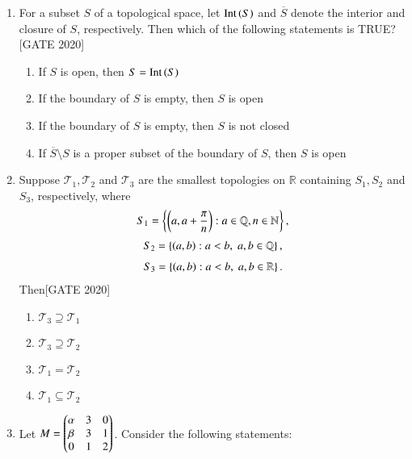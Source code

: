 \documentclass[journal,12pt,onecolumn]{IEEEtran}
\theoremstyle{remark}
\begin{document}
\begin{enumerate}
    \item  For a subset $S$ of a topological space, let $\text{Int}\left(S\right)$ and $\overline{S}$ denote the interior and closure of $S$, respectively. Then which of the following statements is TRUE?
    \hfill{[GATE 2020]}
      \begin{enumerate}
            \item If $S$ is open, then $S = \text{Int}\left(S\right)$
            \item If the boundary of $S$ is empty, then $S$ is open
            \item If the boundary of $S$ is empty, then $S$ is not closed
            \item If $\overline{S} \setminus S$ is a proper subset of the boundary of $S$, then $S$ is open
        \end{enumerate}
    
    \item  Suppose $\mathcal{T}_1, \mathcal{T}_2$ and $\mathcal{T}_3$ are the smallest topologies on $\mathbb{R}$ containing $S_1, S_2$ and $S_3$, respectively, where
    \begin{align*}
    S_1 = \left\{ \left( a, a + \dfrac{\pi}{n} \right) : a \in \mathbb{Q}, n \in \mathbb{N} \right\},
    \end{align*}
    \begin{align*}
    S_2 = \left\{ \left(a, b\right) : a < b, \; a, b \in \mathbb{Q} \right\},
    \end{align*}
    \begin{align*}
    S_3 = \left\{ \left(a, b\right) : a < b, \; a, b \in \mathbb{R} \right\}.
    \end{align*}
    Then\hfill{[GATE 2020]}

        \begin{multicols}{2}\begin{enumerate}
            \item $\mathcal{T}_3 \supseteq \mathcal{T}_1$
            \item $\mathcal{T}_3 \supseteq \mathcal{T}_2$
            \item $\mathcal{T}_1 = \mathcal{T}_2$
            \item $\mathcal{T}_1 \subseteq \mathcal{T}_2$
        \end{enumerate}
        \end{multicols}
  

  
  
   \item     Let $ M = \begin{pmatrix}\alpha & 3 & 0 \\ \beta & 3 & 1 \\ 0 & 1 & 2 \end{pmatrix} $. Consider the following statements:
    

\end{enumerate}
\end{document}
